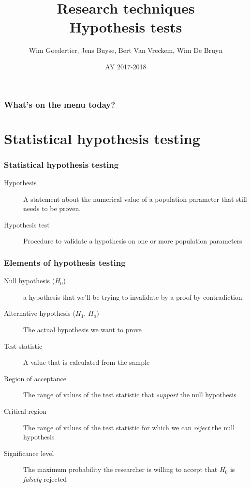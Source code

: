 \documentclass{beamer}
\title[Hypothesis tests]{Research techniques\\Hypothesis tests}
\author{Wim Goedertier, Jens Buyse, Bert {Van Vreckem}, Wim {De Bruyn}}
\date{AY 2017-2018}
\begin{document}

\HoGentLogo

\titleframe



\begin{frame}
  \frametitle{What's on the menu today?}

  \tableofcontents
\end{frame}

\section{Statistical hypothesis testing}
\sectionframelogo{}

\begin{frame}
  \frametitle{Statistical hypothesis testing}

  \begin{description}
    \item[Hypothesis] A statement about the numerical value of a population parameter that still needs to be proven.
    \item[Hypothesis test] Procedure to validate a hypothesis on one or more population parameters
  \end{description}
\end{frame}

\begin{frame}
  \frametitle{Elements of hypothesis testing}

  \begin{description}
    \item[Null hypothesis ($H_0$)] a hypothesis that we'll be trying to invalidate by a proof by contradiction.
    \item[Alternative hypothesis ($H_1$, $H_a$)] The actual hypothesis we want to prove
    \item[Test statistic] A value that is calculated from the sample
    \item[Region of acceptance] The range of values of the test statistic that \textit{support} the null hypothesis
    \item[Critical region] The range of values of the test statistic for which we can \textit{reject} the null hypothesis
    \item[Significance level] The maximum probability the researcher is willing to accept that $H_0$ is \textit{falsely} rejected
  \end{description}
\end{frame}
\end{document}
